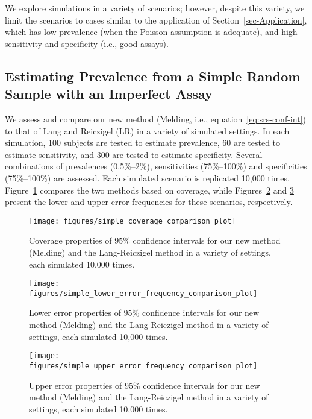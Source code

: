 We explore simulations in a variety of scenarios; however, despite this variety, we limit the scenarios to cases similar to the application of Section~\ref{sec-Application}, which has low prevalence (when the Poisson assumption is adequate), and high
sensitivity and specificity (i.e., good assays).

\subsection{Estimating Prevalence from a Simple Random Sample with an Imperfect Assay}

We assess and compare our new method (Melding, i.e., equation~\ref{eq:srs-conf-int}) to that of Lang and Reiczigel (LR) in a variety of simulated settings.
In each simulation, 100 subjects are tested to estimate prevalence, 60 are tested to estimate sensitivity, and 300 are tested to estimate specificity.
Several combinations of prevalences (0.5\%--2\%), sensitivities (75\%--100\%) and specificities (75\%--100\%) are assessed.
Each simulated scenario is replicated 10,000 times.
Figure~\ref{fig:coverage_comparison_plot} compares the two methods based on coverage, while Figures~\ref{fig:lower_error_frequency_comparison_plot} and \ref{fig:upper_error_frequency_comparison_plot} present the lower and upper error frequencies for these scenarios, respectively.

\begin{figure}
    \centering
    \texttt{[image: figures/simple\_coverage\_comparison\_plot]}
    \caption{Coverage properties of 95\% confidence intervals for our new method (Melding) and the Lang-Reiczigel method in a variety of settings, each simulated 10,000 times.}
    \label{fig:coverage_comparison_plot}
\end{figure}

\begin{figure}
    \centering
    \texttt{[image: figures/simple\_lower\_error\_frequency\_comparison\_plot]}
    \caption{Lower error properties of 95\% confidence intervals for our new method (Melding) and the Lang-Reiczigel method in a variety of settings, each simulated 10,000 times.}
    \label{fig:lower_error_frequency_comparison_plot}
\end{figure}

\begin{figure}
    \centering
    \texttt{[image: figures/simple\_upper\_error\_frequency\_comparison\_plot]}
    \caption{Upper error properties of 95\% confidence intervals for our new method (Melding) and the Lang-Reiczigel method in a variety of settings, each simulated 10,000 times.}
    \label{fig:upper_error_frequency_comparison_plot}
\end{figure}

